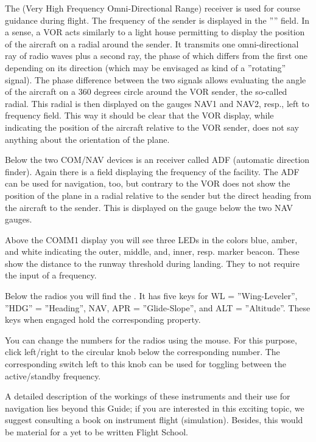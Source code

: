 The  (Very High Frequency Omni-Directional Range) receiver is used for course
guidance during flight. The frequency of the sender is displayed in the '''' field. In a sense, a VOR acts similarly to a light house permitting to display the position of the
aircraft on a radial around the sender. It transmits one omni-directional ray of radio
waves plus a second ray, the phase of which differs from the first one depending on its
direction (which may be envisaged as kind of a ''rotating'' signal). The phase difference between the two signals allows evaluating the angle of the aircraft on a 360 degrees circle
around the VOR sender, the so-called radial. This radial is then displayed on the gauges
NAV1 and NAV2, resp., left to frequency field. This way it should be clear that the VOR display, while indicating the position of the aircraft relative to the VOR sender, does not say anything about the orientation of the plane. 

Below the two COM/NAV devices is an  receiver called ADF (automatic direction
finder). Again there is a field displaying the frequency of the facility. The ADF can be
used for navigation, too, but contrary to the VOR does not show the position of the plane
in a radial relative to the sender but the direct heading from the aircraft to the
sender. This is displayed on the gauge below the two NAV gauges.

Above the COMM1 display you will see three LEDs in the colors blue, amber, and white
indicating the outer, middle, and, inner, resp. marker beacon. These show the distance to the runway
threshold during landing. They to not require the input of a frequency. 

Below the radios you will find the . It has five keys for WL = ''Wing-Leveler'', ''HDG'' = ''Heading'', NAV, APR = ''Glide-Slope'', and ALT = ''Altitude''. These keys when engaged hold the corresponding property. 

You can change the numbers for the radios using the mouse. For this purpose, click left/right to the circular knob below the corresponding number. The corresponding switch left to this knob can be used for toggling between the active/standby frequency.

A detailed description of the workings of these instruments and their use for navigation
lies beyond this Guide; if you are interested in this exciting topic, we suggest
consulting a book on instrument flight (simulation). Besides, this would be material for
a yet to be written \FlightGear{} Flight School. 

